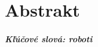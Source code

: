 \documentclass[12pt, twoside, openany]{book}
\begin{document}
\newpage 
\thispagestyle{empty}
\chapter*{Abstrakt}\label{chap:abstract_sk}


\paragraph*{Kľúčové slová: roboti}




\newpage 
\tableofcontents



\newpage 

%


\mainmatter



%
%
%
%
%
%
%
%





\backmatter

\nocite{*}



\end{document}
